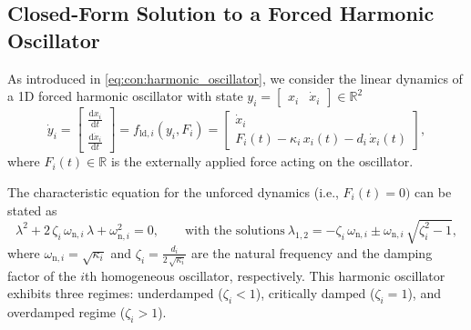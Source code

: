 \subsection{Closed-Form Solution to a Forced Harmonic Oscillator}
As introduced in \eqref{eq:con:harmonic_oscillator}, we consider the linear dynamics of a 1D forced harmonic oscillator with state $y_{i} = \begin{bmatrix}
    x_i & \dot{x}_i
\end{bmatrix} \in \mathbb{R}^2$
\begin{equation}
    \dot{y}_i = \begin{bmatrix}
        \frac{\mathrm{d} x_i}{\mathrm{d} t}\\
        \frac{\mathrm{d} \dot{x}_i}{\mathrm{d} t}
    \end{bmatrix} = f_{\mathrm{ld},i}(y_{i}, F_{i}) = \begin{bmatrix}
        \dot{x}_i\\
        F_i(t) - \kappa_i \, x_i(t) - d_i \, \dot{x}_i(t)
    \end{bmatrix},
\end{equation}
where $F_i(t) \in \mathbb{R}$ is the externally applied force acting on the oscillator.

The characteristic equation for the unforced dynamics (i.e., $F_i(t) = 0)$ can be stated as~\citep{Pas2023damped}
\begin{equation}
    \lambda^2 + 2 \, \zeta_i \, \omega_{\mathrm{n},i}  \, \lambda + \omega_{\mathrm{n},i}^2 = 0,
    \qquad
    \text{with the solutions} \:
    \lambda_{1,2} = -\zeta_{i} \,  \omega_{\mathrm{n},i} \pm \omega_{\mathrm{n},i} \, \sqrt{\zeta_{i}^2 - 1},
\end{equation}
 where $\omega_{\mathrm{n},i} = \sqrt{\kappa_i}$ and $\zeta_i = \frac{d_i}{2 \, \sqrt{\kappa_i}}$ are the natural frequency and the damping factor of the $i$th homogeneous oscillator, respectively.
 This harmonic oscillator exhibits three regimes: underdamped ($\zeta_i < 1$), critically damped ($\zeta_i = 1$), and overdamped regime ($\zeta_i > 1$).

